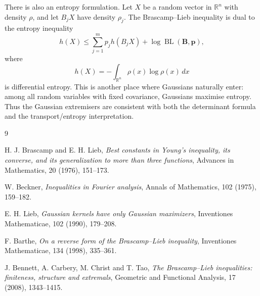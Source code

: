 \documentclass[11pt]{article}
\DeclareMathOperator{\BL}{BL}
\begin{document}
There is also an entropy formulation. Let \(X\) be a random vector in
\(\mathbb R^n\) with density \(\rho\), and let \(B_jX\) have density \(\rho_j\).
The Brascamp--Lieb inequality is dual to the entropy inequality
\[
        h(X)
        \leq
        \sum_{j=1}^m p_j h(B_jX)
        +
        \log \BL(\mathbf B,\mathbf p),
\]
where
\[
        h(X)
        =
        -\int_{\mathbb R^n}\rho(x)\log\rho(x)\,dx
\]
is differential entropy. This is another place where Gaussians naturally enter:
among all random variables with fixed covariance, Gaussians maximise entropy.
Thus the Gaussian extremisers are consistent with both the determinant formula
and the transport/entropy interpretation.

\begin{thebibliography}{9}

H. J. Brascamp and E. H. Lieb,
\emph{Best constants in Young's inequality, its converse, and its generalization to more than three functions},
Advances in Mathematics, 20 (1976), 151--173.

W. Beckner,
\emph{Inequalities in Fourier analysis},
Annals of Mathematics, 102 (1975), 159--182.

E. H. Lieb,
\emph{Gaussian kernels have only Gaussian maximizers},
Inventiones Mathematicae, 102 (1990), 179--208.

F. Barthe,
\emph{On a reverse form of the Brascamp--Lieb inequality},
Inventiones Mathematicae, 134 (1998), 335--361.

J. Bennett, A. Carbery, M. Christ and T. Tao,
\emph{The Brascamp--Lieb inequalities: finiteness, structure and extremals},
Geometric and Functional Analysis, 17 (2008), 1343--1415.

\end{thebibliography}
\end{document}

